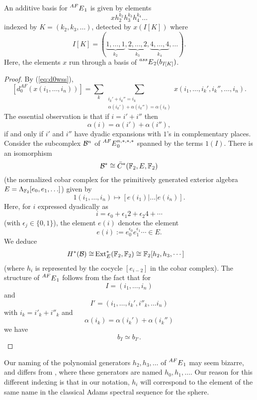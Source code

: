 \begin{prop}
	An additive basis for $\prescript{AF}{}{E}_1$ is given by elements
	$$ x h_2^{k_2} h_3^{k_3}h_4^{k_4} \ldots $$
	indexed by $K = (k_2, k_3, \ldots)$, detected by $x(I[K])$ where 
	$$ I[K] = (\underbrace{1, \ldots ,1}_{k_2}, \underbrace{2, \ldots ,2}_{k_3}, \underbrace{4, \ldots ,4}_{k_4}, \ldots). $$
	Here, the elements $x$ run through a basis of $\prescript{ass}{}{E}_2(b_{I[K]})$.
\end{prop}
	
\begin{proof}
By (\ref{eq:d0wss}), 
\begin{equation}\label{eq:d0AF} 
[d_0^{AF}(x(i_1, \ldots, i_n))] = \sum_k \sum_{\substack{i_k'+i_k'' = i_k \\ \alpha(i_k')+\alpha(i_k'') = \alpha(i_k)}} x(i_1, \ldots, i_k', i_k'', \ldots, i_n). 
\end{equation}
	The essential observation is that if $i = i' + i''$ then
	$$ \alpha(i) = \alpha{(i')} + \alpha{(i'')}, $$
	if and only if $i'$ and $i''$ have dyadic expansions with $1$'s in complementary places. 
	Consider the subcomplex $\mathcal{B}^n$ of $\prescript{AF}{}{E}_0^{n,*,*,*}$ spanned by the terms $1(I)$.  There is an isomorphism
	$$ \mathcal{B}^* \cong \bar{C}^{*}(\mathbb{F}_2, E, \mathbb{F}_2) $$
	(the normalized cobar complex for the primitively generated exterior algebra $E = \Lambda_{\mathbb{F}_2}[e_0, e_1, \ldots]$) given by 
	$$ 1(i_1, \ldots, i_n) \mapsto [e(i_1)|\ldots|e(i_n)]. $$
	Here, for $i$ expressed dyadically as 
	$$ i = \epsilon_0 + \epsilon_1 2 + \epsilon_2 4 + \cdots $$
	(with $\epsilon_j \in \{0,1\}$), the element $e(i)$ denotes the element
	$$ e(i) := e_0^{\epsilon_0} e_1^{\epsilon_1} \cdots \in E. $$
	We deduce
	\begin{align*} H^*(\mathcal{B}) \cong & \operatorname{Ext}^*_{E}(\mathbb{F}_2, \mathbb{F}_2) \cong
		 \mathbb{F}_2[h_2, h_3, \cdots ]
    \end{align*}
	(where $h_i$ is represented by the cocycle $[e_{i-2}]$ in the cobar complex).  The structure of $\prescript{AF}{}{E}_1$ follows from the fact that for 
	$$ I = (i_1, \ldots, i_n) $$ 
	and
	$$ I' = (i_1, \ldots, i_k', i''_k, \ldots i_n) $$
	with $i_k = i'_k + i''_k$ and
	$$ \alpha(i_k) = \alpha(i_k')+\alpha(i_k'') $$
	we have
	$$ b_I \simeq b_{I'}. $$
\end{proof}

\begin{rmk}
	Our naming of the polynomial generators $h_2, h_3, \ldots$ of $\prescript{AF}{}{E}_1$ may seem bizarre, and differs from \cite{LM}, where these generators are named $h_0, h_1, \ldots$.  Our reason for this different indexing is that in our notation, $h_i$ will correspond to the element of the same name in the classical Adams spectral sequence for the sphere.
\end{rmk}


